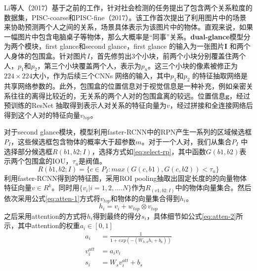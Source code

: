 Li等人（2017）\cite{li2017dual-glance}基于之前的工作，针对社会检测的任务提出了包含两个关系粒度的数据集，PISC-coarse和PISC-fine（2017）\cite{li2017dual-glance}。该工作首次提出了利用图片中的场景来协助预测两个人之间的关系，场景具体表示为该图片中的物体。直观来说，如果一幅图片中包含电脑桌子等物体，那么大概率是``同事''关系。\textbf{dual-glance}模型分为两个模块，first glance和second glance，first glance 的输入为一张图片$\mathbf{I}$ 和两个人身体的包围盒。针对图片$I$，首先修剪出3个小块，前两个小块分别覆盖住两个人，$p_1$和$p_2$，第三个小块覆盖两个人，表示为$p_{u}$。这三个小块的像素被修正为$224 \times 224$大小，作为后续三个CNNs 网络的输入，其中$p_1$和$p_2$ 的特征抽取网络是共享网络参数的。此外，包围盒的位置信息对于视觉信息是一种补充，例如亲密关系往往的离得比较近的，无关系的两个人对的包围盒离的较远。位置信息$\mathbf{g}$，经过预训练的ResNet\cite{he2016deep} 抽取得到表示人对关系的特征向量为$v$，经过拼接和全连接网络后得到这个人对的特征向量$v_{top}$。

对于second glance模块，模型利用faster-RCNN\cite{ren2015faster}中的RPN产生一系列的区域候选框$P_{I}$，这些候选框包含物体的概率大于超参数$m$。对于一个人对，我们从集合$P_{I}$ 中选择部分候选框$R(b1,b2;I)$，选择方式如\ref{eq:select-rp}，其中函数$G(b1,b2)$表示两个包围盒的IOU，$\tau_{u}$是阀值。
\begin{equation}\label{eq:select-rp}
    R(b1,b2;I) = \{c \in P_{I} : max(G(c,b1),G(c,b2))<\tau_{u}\}
\end{equation}
利用faster-RCNN得到的特征图，采用ROI pooling抽取出固定长度的的向量物体特征向量$v \in R^{k}$。同时用$\{v_i|i=1, 2, .... N\}$作为$R_(v1,b2;I)$中的物体向量集合。然后依次采用公式\ref{eq:atten-1}方式将$v_{top}$和物体的向量集合得到$h_i$。
\begin{equation}\label{eq:atten-1}
    h_i = v_i + w_{top} \otimes v_{top}
\end{equation}
之后采用attention的方式将$h_i$得到最终的得分$s_i$，具体细节如公式\ref{eq:atten-2}所示，其中attention的权重$a_{i} \in [0,1]$
\begin{equation} \label{eq:atten-2}
    \begin{split}
        a_{i} &= \frac{1}{1+exp(-(W_{h,a}h_{i}+b_{a}))} \\
        v^{att}_{i} &= a_{i}v_{i} \\
        s_{i} &= W_{s} v_{i}^{att} + b_{s}
    \end{split}
\end{equation}

